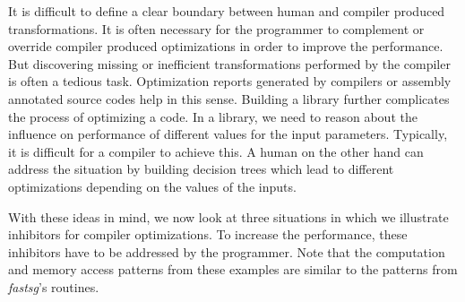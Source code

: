 

It is difficult to define a clear boundary between human and compiler produced
transformations. It is often necessary for the programmer to complement or
override compiler produced optimizations in order to improve the performance.
But discovering missing or inefficient transformations performed by the compiler
is often a tedious task. Optimization reports  generated by compilers or
assembly annotated source codes help in this sense. Building a library further
complicates the process of optimizing a code.
In a library, we need to reason about the influence on performance of different
values for the input parameters. Typically, it is difficult for a compiler to
achieve this. A human on the other hand can address the situation by building
decision trees which lead to different optimizations depending on the values of
the inputs.

With these ideas in mind, we now look at three situations in which we illustrate
inhibitors for compiler optimizations. To increase the performance, these
inhibitors have to be addressed by the programmer. Note that the computation and
memory access patterns from these examples are similar to the patterns from
\textit{fastsg}'s routines.

